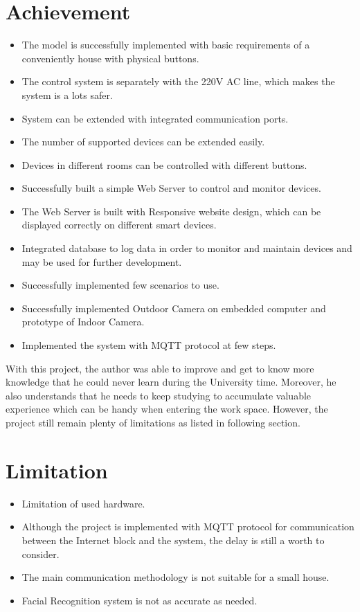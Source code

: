 \section{Achievement}
\begin{itemize}
\item The model is successfully implemented with basic requirements of a conveniently house with physical buttons.
\item The control system is separately with the 220V AC line, which makes the system is a lots safer.
\item System can be extended with integrated communication ports.
\item The number of supported devices can be extended easily.
\item Devices in different rooms can be controlled with different buttons.
\item Successfully built a simple Web Server to control and monitor devices.
\item The Web Server is built with Responsive website design, which can be displayed correctly on different smart devices.
\item Integrated database to log data in order to monitor and maintain devices and may be used for further development.
\item Successfully implemented few scenarios to use.
\item Successfully implemented Outdoor Camera on embedded computer and prototype of Indoor Camera.
\item Implemented the system with MQTT protocol at few steps.
\end{itemize}
With this project, the author was able to improve and get to know more knowledge that he could never learn during the University time. Moreover, he also understands that he needs to keep studying to accumulate valuable experience which can be handy when entering the work space. However, the project still remain plenty of limitations as listed in following section. 

\section{Limitation}
\begin{itemize}
\item Limitation of used hardware.
\item Although the project is implemented with MQTT protocol for communication between the Internet block and the system, the delay is still a worth to consider.
\item The main communication methodology is not suitable for a small house.
\item Facial Recognition system is not as accurate as needed.
\end{itemize}


